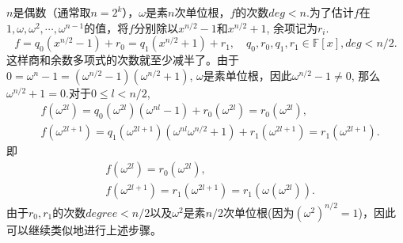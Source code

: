 \documentclass[10pt]{ctexart}
\begin{document}
$n$是偶数（通常取$n=2^k$），$\omega$是素$n$次单位根，$f$的次数$deg < n$.为了估计$f$在$1,\omega,\omega^2,\cdots,\omega^{n-1}$的值，将$f$分别除以$x^{n/2}-1$和$x^{n/2}+1$, 余项记为$r_i$.
\begin{displaymath}
    f = q_0(x^{n/2}-1) + r_0 = q_1(x^{n/2}+1) + r_1, \quad q_0,r_0,q_1,r_1 \in \mathbb{F}[x], deg < n/2.
\end{displaymath}
这样商和余数多项式的次数就至少减半了。由于$0 = \omega^n - 1 = (\omega^{n/2} - 1)(\omega^{n/2} + 1)$, $\omega$是素单位根，因此$\omega^{n/2} - 1 \neq 0$, 那么$\omega^{n/2} + 1 = 0$.对于$0 \le l < n/2$,
\begin{displaymath}
    \begin{aligned}
        & f(\omega^{2l}) = q_0(\omega^{2l})(\omega^{nl} - 1) + r_0(\omega^{2l}) = r_0(\omega^{2l}), \\
        & f(\omega^{2l+1}) = q_1(\omega^{2l+1})(\omega^{nl}\omega^{n/2} + 1) + r_1(\omega^{2l+1}) = r_1(\omega^{2l+1}).
    \end{aligned}
\end{displaymath}
即
\begin{displaymath}
    \begin{aligned}
        & f(\omega^{2l})  = r_0(\omega^{2l}), \\
        & f(\omega^{2l+1}) =  r_1(\omega^{2l+1}) = r_1(\omega (\omega^{2l})).
    \end{aligned}
\end{displaymath}
由于$r_0,r_1$的次数$degree < n/2$以及$\omega^2$是素$n/2$次单位根(因为$(\omega^2)^{n/2} = 1$)，因此可以继续类似地进行上述步骤。
\end{document}

